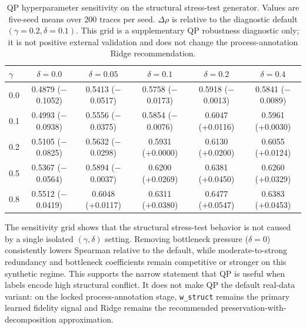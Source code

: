 \documentclass[a4paper,fleqn]{cas-sc}
\begin{document}
\begin{table}[ht]
\caption{QP hyperparameter sensitivity on the structural stress-test generator. Values are five-seed means over 200 traces per seed. $\Delta\rho$ is relative to the diagnostic default $(\gamma=0.2,\delta=0.1)$. This grid is a supplementary QP robustness diagnostic only; it is not positive external validation and does not change the process-annotation Ridge recommendation.}
\label{tab:supp-gamma-delta-sensitivity}
\centering
\small
\begin{tabular}{lccccc}
\toprule
\textbf{$\gamma$} & \textbf{$\delta=0.0$} & \textbf{$\delta=0.05$} & \textbf{$\delta=0.1$} & \textbf{$\delta=0.2$} & \textbf{$\delta=0.4$} \\
\midrule
0.0 & 0.4879 ($-$0.1052) & 0.5413 ($-$0.0517) & 0.5758 ($-$0.0173) & 0.5918 ($-$0.0013) & 0.5841 ($-$0.0089) \\
0.1 & 0.4993 ($-$0.0938) & 0.5556 ($-$0.0375) & 0.5854 ($-$0.0076) & 0.6047 (+0.0116) & 0.5961 (+0.0030) \\
0.2 & 0.5105 ($-$0.0825) & 0.5632 ($-$0.0298) & 0.5931 (+0.0000) & 0.6130 (+0.0200) & 0.6055 (+0.0124) \\
0.5 & 0.5367 ($-$0.0564) & 0.5894 ($-$0.0037) & 0.6200 (+0.0269) & 0.6381 (+0.0450) & 0.6260 (+0.0329) \\
0.8 & 0.5512 ($-$0.0419) & 0.6048 (+0.0117) & 0.6311 (+0.0380) & 0.6477 (+0.0547) & 0.6383 (+0.0453) \\
\bottomrule
\end{tabular}
\end{table}

The sensitivity grid shows that the structural stress-test behavior is not caused by a single isolated $(\gamma,\delta)$ setting. Removing bottleneck pressure ($\delta=0$) consistently lowers Spearman relative to the default, while moderate-to-strong redundancy and bottleneck coefficients remain competitive or stronger on this synthetic regime. This supports the narrow statement that QP is useful when labels encode high structural conflict. It does not make QP the default real-data variant: on the locked process-annotation stage, \texttt{w\_struct} remains the primary learned fidelity signal and Ridge remains the recommended preservation-with-decomposition approximation.
\end{document}
